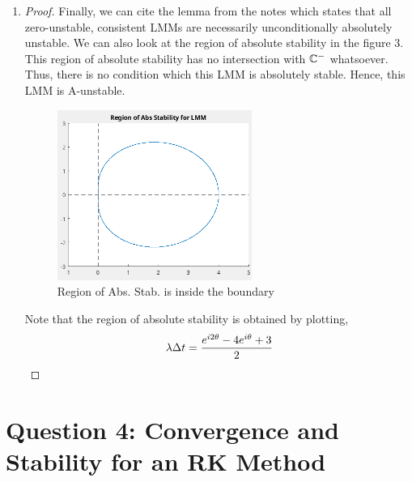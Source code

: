 \documentclass{article}
\begin{document}
\begin{enumerate}[label=\alph*)]
  \item 

  \begin{proof}
    Finally, we can cite the lemma from the notes which states that all
    zero-unstable, consistent LMMs are necessarily unconditionally absolutely
    unstable. We can also look at the region of absolute stability in the figure
    3. This region of absolute stability has no intersection with $\mathbb{C}^-$
    whatsoever. Thus, there is no condition which this LMM is absolutely stable.
    Hence, this LMM is A-unstable. 
    \begin{figure}[h]
        \centering
        \includegraphics[width=0.6\textwidth]{3cAbsStabRegion.png}
        \caption{Region of Abs. Stab. is inside the boundary}
    \end{figure}

    Note that the region of absolute stability is obtained by plotting,
    \begin{align*}
        \lambda\Delta t = \frac{e^{i2\theta} - 4e^{i\theta} + 3}{2}
    \end{align*}

  \end{proof}

\end{enumerate}

\section*{Question 4: Convergence and Stability for an RK Method}
\end{document}
